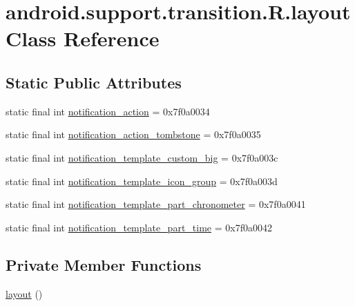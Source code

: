 \hypertarget{classandroid_1_1support_1_1transition_1_1_r_1_1layout}{}\section{android.\+support.\+transition.\+R.\+layout Class Reference}
\label{classandroid_1_1support_1_1transition_1_1_r_1_1layout}
\subsection*{Static Public Attributes}
\begin{DoxyCompactItemize}
\item 
static final int \mbox{\hyperlink{classandroid_1_1support_1_1transition_1_1_r_1_1layout_a3134dda494a06cd67a831ff544ed3794}{notification\+\_\+action}} = 0x7f0a0034
\item 
static final int \mbox{\hyperlink{classandroid_1_1support_1_1transition_1_1_r_1_1layout_add1ee4fa5428d4691c03956d3e88f746}{notification\+\_\+action\+\_\+tombstone}} = 0x7f0a0035
\item 
static final int \mbox{\hyperlink{classandroid_1_1support_1_1transition_1_1_r_1_1layout_ad75a504838c07c3ddefc6665e6a00f3a}{notification\+\_\+template\+\_\+custom\+\_\+big}} = 0x7f0a003c
\item 
static final int \mbox{\hyperlink{classandroid_1_1support_1_1transition_1_1_r_1_1layout_a64b8e888e8b70c0d633e86bb6c90393f}{notification\+\_\+template\+\_\+icon\+\_\+group}} = 0x7f0a003d
\item 
static final int \mbox{\hyperlink{classandroid_1_1support_1_1transition_1_1_r_1_1layout_a7a65ce710da544bde7dcf66de2a35a68}{notification\+\_\+template\+\_\+part\+\_\+chronometer}} = 0x7f0a0041
\item 
static final int \mbox{\hyperlink{classandroid_1_1support_1_1transition_1_1_r_1_1layout_aa67b5ed098ab3763d52f82b3e2edd7b3}{notification\+\_\+template\+\_\+part\+\_\+time}} = 0x7f0a0042
\end{DoxyCompactItemize}
\subsection*{Private Member Functions}
\begin{DoxyCompactItemize}
\item 
\mbox{\hyperlink{classandroid_1_1support_1_1transition_1_1_r_1_1layout_a4699b98da7446f37c94d9e84c76ef1a9}{layout}} ()
\end{DoxyCompactItemize}


